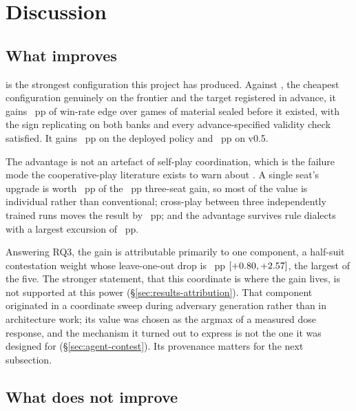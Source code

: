 \section{Discussion}
\label{sec:discussion}

\subsection{What \sestina{} improves}
\label{sec:discussion-improves}

\sestina{} is the strongest configuration this project has produced. Against \fcheap{}, the
cheapest configuration genuinely on the \vsix{} frontier and the target registered in advance, it
gains \vsevenBtwoFcheapMag{}~pp of win-rate edge over \vsevenBtwoFcheapN{} games of material sealed
before it existed, with the sign replicating on both banks and every advance-specified validity check
satisfied. It gains \vsevenBtwoIncumbent{}~pp on the deployed \vsix{} policy and
\vsevenBtwoVfive{}~pp on v0.5.

The advantage is not an artefact of self-play coordination, which is the failure mode the
cooperative-play literature exists to warn about \cite{bard-hanabi,hu-otherplay}. A single seat's
upgrade is worth \vsevenOneSeatFive{}~pp of the \vsevenSoneSelf{}~pp three-seat gain, so most of the
value is individual rather than conventional; cross-play between three independently trained runs
moves the result by \vsevenXpGapAbs{}~pp; and the advantage survives \vsevenDiaRowsWord{} rule dialects
with a largest excursion of \vsevenDiaMaxExcursion{}~pp.

Answering RQ3, the gain is attributable primarily to one component, a half-suit contestation weight
whose leave-one-out drop is \vsevenLooRtwelve{}~pp
$[+0.80, +2.57]$, the largest of the five. The stronger statement, that
this coordinate is where the gain lives, is not supported at this power
(\S\ref{sec:results-attribution}). That component originated in a coordinate sweep during adversary generation rather than in
architecture work; its value was chosen as the argmax of a measured dose response, and the mechanism
it turned out to express is not the one it was designed for (\S\ref{sec:agent-contest}). Its
provenance matters for the next subsection.

\subsection{What \sestina{} does not improve}
\label{sec:discussion-notimproves}

